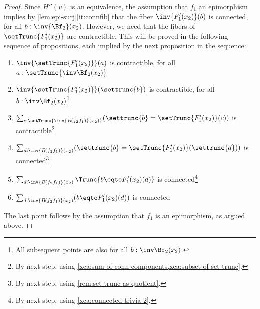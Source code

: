 \begin{proof}
Since $H''(v)$ is an equivalence, the assumption that $f_1$ an epimorphism
implies by \cref{lem:epi-surj}\ref{it:connfib} that the
fiber $\inv{F'_1(x_2)}(b)$ is connected, for all $b:\inv{\Bf_2}(x_2)$.
However, we need that the fibers of $\setTrunc{F'_1(x_2)}$ are contractible.
This will be proved in the following sequence of propositions, 
each implied by the next proposition in the sequence:
\begin{enumerate}[label*=(\alph*)]
\item $\inv{\setTrunc{F'_1(x_2)}}(a)$ is contractible, 
for all $a:\setTrunc{\inv\Bf_2(x_2)}$
\item $\inv{\setTrunc{F'_1(x_2)}}(\settrunc{b})$ is contractible, 
for all $b:\inv\Bf_2(x_2)$\footnote{%
All subsequent points are also for all $b:\inv\Bf_2(x_2)$.}
\item $\sum_{c:\setTrunc{\inv{B\mkern -2mu (f_2f_1)}(x_2)}}(\settrunc{b}=
\setTrunc{F'_1(x_2)}(c))$ is contractible\footnote{%
By next step, using \cref{xca:sum-of-conn-components,xca:subset-of-set-trunc}.}
\item $\sum_{d:\inv{B\mkern -2mu (f_2f_1)}(x_2)}(\settrunc{b}=
\setTrunc{F'_1(x_2)}(\settrunc{d}))$ is connected\footnote{%
By next step, using \cref{rem:set-trunc-as-quotient}.}   
\item $\sum_{d:\inv{B\mkern -2mu (f_2f_1)}(x_2)}\Trunc{b\eqto
F'_1(x_2)(d)}$ is connected\footnote{%
By next step, using \cref{xca:connected-trivia-2}.}  
\item $\sum_{d:\inv{B\mkern -2mu (f_2f_1)}(x_2)}(b\eqto
F'_1(x_2)(d))$ is connected 
\end{enumerate}
The last point follows by the assumption that $f_1$ is an epimorphism,
as argued above.
\end{proof}


